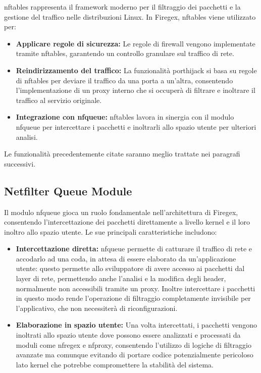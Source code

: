 \gls{nftables} rappresenta il framework moderno per il filtraggio dei pacchetti e la gestione del traffico nelle distribuzioni Linux. In Firegex, \gls{nftables} viene utilizzato per:
\begin{itemize}
    \item \textbf{Applicare regole di sicurezza:} Le regole di firewall vengono implementate tramite \gls{nftables}, garantendo un controllo granulare sul traffico di rete.
    \item \textbf{Reindirizzamento del traffico:} La funzionalità \gls{porthijack} si basa su regole di \gls{nftables} per deviare il traffico da una porta a un’altra, consentendo l’implementazione di un proxy interno che si occuperà di filtrare e inoltrare il traffico al servizio originale.
    \item \textbf{Integrazione con \gls{nfqueue}:} \gls{nftables} lavora in sinergia con il modulo \gls{nfqueue} per intercettare i pacchetti e inoltrarli allo spazio utente per ulteriori analisi.
\end{itemize}

Le funzionalità precedentemente citate saranno meglio trattate nei paragrafi successivi.

\subsection{Netfilter Queue Module}
Il modulo \gls{nfqueue} gioca un ruolo fondamentale nell'architettura di Firegex, consentendo l'intercettazione dei pacchetti direttamente a livello kernel e il loro inoltro allo spazio utente. Le sue principali caratteristiche includono:
\begin{itemize}
    \setlength{\itemsep}{1pt}
    \setlength{\parskip}{1pt}
    \item \textbf{Intercettazione diretta:} \gls{nfqueue} permette di catturare il traffico di rete e accodarlo ad una coda, in attesa di essere elaborato da un'applicazione utente: questo permette allo sviluppatore di avere accesso ai pacchetti dal layer di rete, permettendo anche l'analisi e la modifica degli header, normalmente non accessibili tramite un proxy. Inoltre intercettare i pacchetti in questo modo rende l'operazione di filtraggio completamente invisibile per l'applicativo, che non necessiterà di riconfigurazioni.
    \item \textbf{Elaborazione in spazio utente:} Una volta intercettati, i pacchetti vengono inoltrati allo spazio utente dove possono essere analizzati e processati da moduli come \gls{nfregex} e \gls{nfproxy}, consentendo l'utilizzo di logiche di filtraggio avanzate ma comunque evitando di portare codice potenzialmente pericoloso lato kernel che potrebbe compromettere la stabilità del sistema.
\end{itemize}

